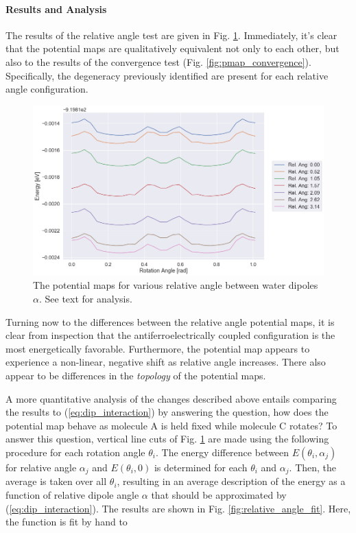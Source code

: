         \paragraph{Results and Analysis}
        
        The results of the relative angle test are given in Fig. \ref{fig:pmap_rel_angle}. Immediately, it's clear that the potential maps are qualitatively equivalent not only to each other, but also to the results of the convergence test (Fig. \ref{fig:pmap_convergence}). Specifically, the degeneracy previously identified are present for each relative angle configuration. 
        
        \begin{figure}
            \centering
            \includegraphics[width=0.9\linewidth]{Figures/System/pmap_rel_angle.png}
            \caption{The potential maps for various relative angle between water dipoles $\alpha$. See text for analysis.}
            \label{fig:pmap_rel_angle}
        \end{figure}
        
        Turning now to the differences between the relative angle potential maps, it is clear from inspection that the antiferroelectrically coupled configuration is the most energetically favorable. Furthermore, the potential map appears to experience a non-linear, negative shift as relative angle increases. There also appear to be differences in the \textit{topology} of the potential maps. 
        
        A more quantitative analysis of the changes described above entails comparing the results to (\ref{eq:dip_interaction}) by answering the question, how does the potential map behave as molecule A is held fixed while molecule C rotates? To answer this question, vertical line cuts of Fig. \ref{fig:pmap_rel_angle} are made using the following procedure for each rotation angle $\theta_i$. The energy difference between $E(\theta_i,\alpha_j)$ for relative angle $\alpha_j$ and $E(\theta_i,0)$ is determined for each $\theta_i$ and $\alpha_j$. Then, the average is taken over all $\theta_i$, resulting in an average description of the energy as a function of relative dipole angle $\alpha$ that should be approximated by (\ref{eq:dip_interaction}). The results are shown in Fig. \ref{fig:relative_angle_fit}. Here, the function is fit by hand to 
        
